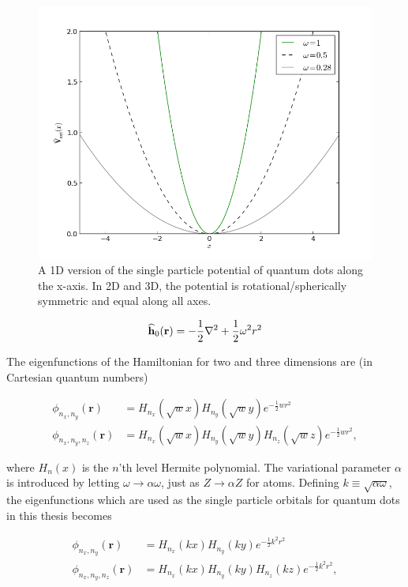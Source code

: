 \begin{figure}
 \begin{center}
  \includegraphics[scale=0.5]{../Graphics/Potentials/qdots.png}
  \caption{A 1D version of the single particle potential of quantum dots along the x-axis. In 2D and 3D, the potential is rotational/spherically symmetric and equal along all axes.}
  \label{fig:extPotQDOTS}
 \end{center}
\end{figure}


\begin{equation}
 {\bf\widehat{h}}_0(\mathbf{r}) = -\frac{1}{2}\nabla^2 + \frac{1}{2}\omega^2r^2
\end{equation}

The eigenfunctions of the Hamiltonian for two and three dimensions are (in Cartesian quantum numbers)

\begin{align}
\phi_{n_x, n_y}(\mathbf{r}) &= H_{n_x}(\sqrt{w}x)H_{n_y}(\sqrt{w}y)e^{-\frac{1}{2}wr^2} \\
\phi_{n_x, n_y, n_z}(\mathbf{r}) &= H_{n_x}(\sqrt{w}x)H_{n_y}(\sqrt{w}y)H_{n_z}(\sqrt{w}z)e^{-\frac{1}{2}wr^2},
\end{align}

where $H_n(x)$ is the $n$'th level Hermite polynomial. The variational parameter $\alpha$ is introduced by letting $\omega\to\alpha\omega$, just as $Z\to\alpha Z$ for atoms. Defining $k\equiv\sqrt{\alpha\omega}$, the eigenfunctions which are used as the single particle orbitals for quantum dots in this thesis becomes

\begin{align}
\phi_{n_x, n_y}(\mathbf{r}) &= H_{n_x}(kx)H_{n_y}(ky)e^{-\frac{1}{2}k^2r^2} \\
\phi_{n_x, n_y, n_z}(\mathbf{r}) &= H_{n_x}(kx)H_{n_y}(ky)H_{n_z}(kz)e^{-\frac{1}{2}k^2r^2},
\end{align}

